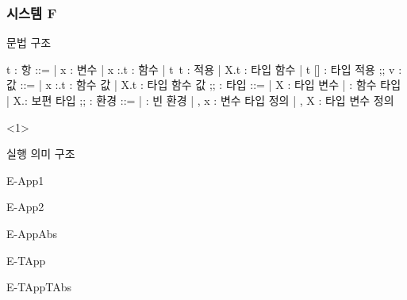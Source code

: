 \documentclass{beamer}
\begin{document}
\begin{frame}[c, fragile]
  \frametitle{시스템 F}

  \scriptsize
  \begin{minipage}[t]{0.49\linewidth}
    문법 구조
    \begin{center}
      \def\typecolon{{:}}
      \begin{bnf}
        t : 항 ::=
        | x : 변수
        | \lambda x \typecolon \tau.t : 함수
        | t\ t : 적용
        | \Lambda X.t : 타입 함수
        | t [\tau] : 타입 적용
        ;;
        v : 값 ::=
        | \lambda x \typecolon \tau .t : 함수 값
        | \Lambda X.t : 타입 함수 값
        ;;
        \tau : 타입 ::=
        | X : 타입 변수
        | \tau \to \tau : 함수 타입
        | \forall X.\tau : 보편 타입
        ;;
        \Gamma : 환경 ::=
        | \varnothing : 빈 환경
        | \Gamma, x \mathrel{\typecolon} \tau : 변수 타입 정의
        | \Gamma, X : 타입 변수 정의
      \end{bnf}
    \end{center}
  \end{minipage}
  \begin{onlyenv}<1>
    \begin{minipage}[t]{0.49\linewidth}
      실행 의미 구조\hfill{}
      \begin{center}
        \begin{InfRule}{E-App1}
        \end{InfRule}
        \begin{InfRule}{E-App2}
        \end{InfRule}
        \begin{InfRule}{E-AppAbs}
        \end{InfRule}
        \begin{InfRule}{E-TApp}
        \end{InfRule}
        \begin{InfRule}{E-TAppTAbs}
        \end{InfRule}
      \end{center}

\end{minipage}
\end{onlyenv}
\end{frame}
\end{document}
